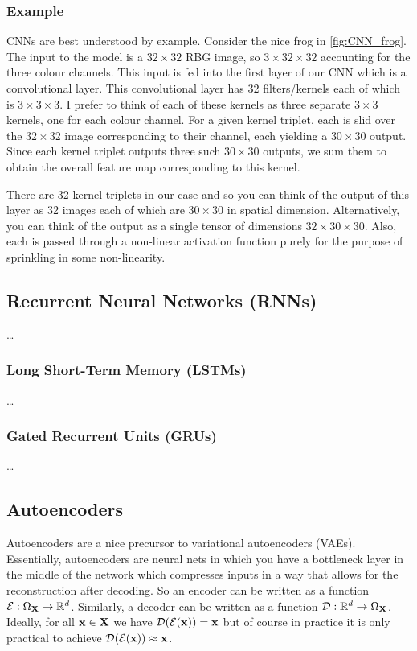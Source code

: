 \documentclass[11pt]{article}
\begin{document}
\subsubsection{Example}
CNNs are best understood by example. Consider the nice frog in \autoref{fig:CNN_frog}. The input to the model is a $32\times32$ RBG image, so $3\times32\times32$ accounting for the three colour channels. This input is fed into the first layer of our CNN which is a convolutional layer. This convolutional layer has 32 filters/kernels each of which is $3\times3\times3$. I prefer to think of each of these kernels as three separate $3\times3$ kernels, one for each colour channel. For a given kernel triplet, each is slid over the $32\times32$ image corresponding to their channel, each yielding a $30\times30$ output. Since each kernel triplet outputs three such $30\times30$ outputs, we sum them to obtain the overall feature map corresponding to this kernel.

There are 32 kernel triplets in our case and so you can think of the output of this layer as 32 images each of which are $30\times30$ in spatial dimension. Alternatively, you can think of the output as a single tensor of dimensions $32\times30\times30$. Also, each is passed through a non-linear activation function purely for the purpose of sprinkling in some non-linearity.

\subsection{Recurrent Neural Networks (RNNs)}
\dots

\subsubsection{Long Short-Term Memory (LSTMs)}
\dots

\subsubsection{Gated Recurrent Units (GRUs)}
\dots

\subsection{Autoencoders}
\label{sec:autoencoders}
Autoencoders are a nice precursor to variational autoencoders (VAEs). Essentially, autoencoders are neural nets in which you have a bottleneck layer in the middle of the network which compresses inputs in a way that allows for the reconstruction after decoding. So an encoder can be written as a function $\mathcal{E}:\Omega_{\mathbf{X}}\rightarrow\mathbb{R}^d$. Similarly, a decoder can be written as a function $\mathcal{D}:\mathbb{R}^d\rightarrow\Omega_{\mathbf{X}}$. Ideally, for all $\mathbf{x}\in\mathbf{X}$ we have $\mathcal{D}(\mathcal{E}(\mathbf{x}))=\mathbf{x}$ but of course in practice it is only practical to achieve $\mathcal{D}(\mathcal{E}(\mathbf{x}))\approx\mathbf{x}$.
\end{document}
